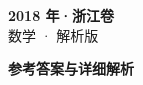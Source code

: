 \documentclass[zihao=-4, a4paper]{ctexart}
\begin{document}
\begin{center}
  {\Large\bfseries 2018 年·浙江卷}\\[4pt]
  {\large 数学 · 解析版}
\end{center}
\medskip
{}

\clearpage
{}
\begin{center}{\Large\bfseries 参考答案与详细解析}\end{center}
\medskip

\end{document}
